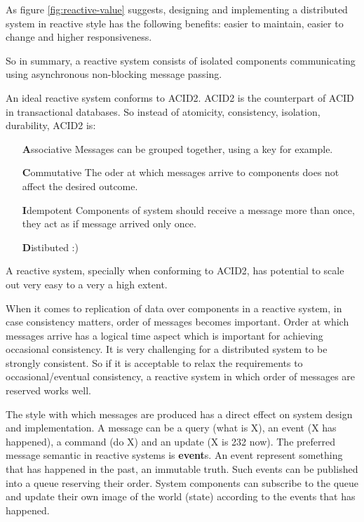 \documentclass[a4]{report}
\begin{document}
    As figure \ref{fig:reactive-value} suggests, designing and implementing a distributed system in reactive style
    has the following benefits: easier to maintain, easier to change and higher responsiveness.

    So in summary, a reactive system consists of isolated components communicating using asynchronous non-blocking message passing.

    An ideal reactive system conforms to ACID2.
    ACID2 is the counterpart of ACID in transactional databases.
    So instead of atomicity, consistency, isolation, durability, ACID2 is:
    \begin{itemize}
        \item[\textbf{A}ssociative] Messages can be grouped together, using a key for example.
        \item[\textbf{C}ommutative] The oder at which messages arrive to components does not affect the desired
        outcome.
        \item[\textbf{I}dempotent] Components of system should receive a message more than once, they act as if message
        arrived only once.
        \item[\textbf{D}istibuted] :)
    \end{itemize}

    A reactive system, specially when conforming to ACID2, has potential to scale out very easy to a very a high extent.


    When it comes to replication of data over components in a reactive system, in case consistency matters, order of
    messages becomes important.
    Order at which messages arrive has a logical time aspect which is important for achieving occasional consistency.
    It is very challenging for a distributed system to be strongly consistent.
    So if it is acceptable to relax the requirements to occasional/eventual consistency, a reactive system in which
    order of messages are reserved works well.

    The style with which messages are produced has a direct effect on system design and implementation.
    A message can be a query (what is X), an event (X has happened), a command (do X) and an update (X is 232 now).
    The preferred message semantic in reactive systems is \textbf{event}s.
    An event represent something that has happened in the past, an immutable truth.
    Such events can be published into a queue reserving their order.
    System components can subscribe to the queue and update their own image of the world (state) according to the
    events that has happened.
\end{document}
